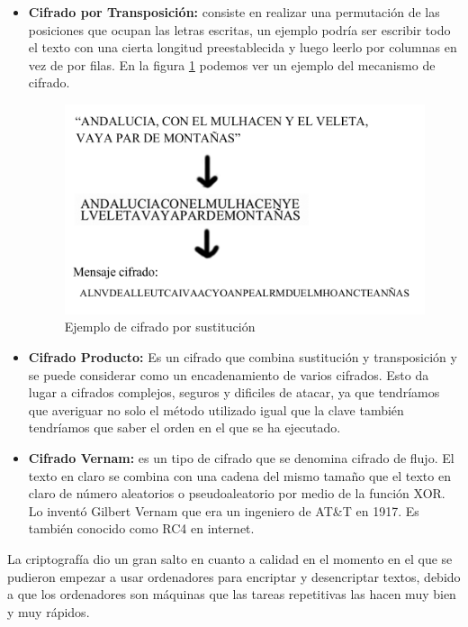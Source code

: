 \begin{itemize}
	\item \textbf{Cifrado por Transposición:} consiste en realizar una permutación de las posiciones que ocupan las letras escritas, un ejemplo podría ser escribir todo el texto con una cierta longitud preestablecida y luego leerlo por columnas en vez de por filas. En la figura \ref{fig:cifradoTransposicion} podemos ver un ejemplo del mecanismo de cifrado.  

\begin{figure}
  \centering
    \includegraphics[scale=0.4]{./ConocimientosPrevios/imagenes/cifradoTransposicion.png}
  \caption{Ejemplo de cifrado por sustitución}
  \label{fig:cifradoTransposicion}
\end{figure}	

	\item \textbf{Cifrado Producto:} Es un cifrado que combina sustitución y transposición y se puede considerar como un encadenamiento de varios cifrados. Esto da lugar a cifrados complejos, seguros y dificiles de atacar, ya que tendríamos que averiguar no solo el método utilizado igual que la clave también tendríamos que saber el orden en el que se ha ejecutado.


	\item \textbf{Cifrado Vernam:} es un tipo de cifrado que se denomina cifrado de flujo. El texto en claro se combina con una cadena del mismo tamaño que el texto en claro de número aleatorios o pseudoaleatorio por medio de la función XOR. Lo inventó Gilbert Vernam que era un ingeniero de AT\&T en 1917. Es también conocido como RC4 en internet.  
	
\end{itemize}

La criptografía dio un gran salto en cuanto a calidad en el momento en el que se pudieron empezar a usar ordenadores para encriptar y desencriptar textos, debido a que los ordenadores son máquinas que las tareas repetitivas las hacen muy bien y muy rápidos.

